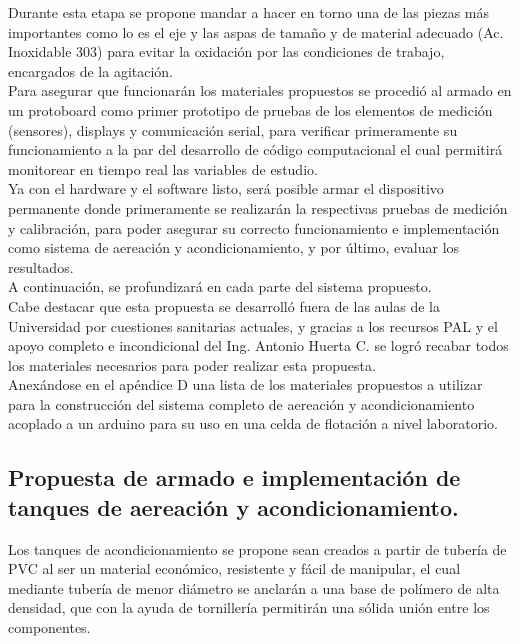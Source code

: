 \documentclass[11pt,letter
								]
								{article}
\begin{document}
Durante esta etapa se propone  mandar a hacer en torno  una de  las piezas más importantes como lo es el eje y las aspas  de tamaño y de material adecuado (Ac. Inoxidable 303) para evitar la oxidación por las condiciones de trabajo, encargados de la agitación. \\



Para asegurar que funcionarán los materiales propuestos  se procedió al armado  en un  protoboard como primer prototipo de pruebas de los elementos  de medición (sensores), displays y comunicación serial, para verificar primeramente su funcionamiento a la par del desarrollo de código computacional el cual permitirá monitorear en tiempo real las variables de estudio.\\


Ya con el hardware y el software listo, será posible armar el dispositivo  permanente donde  primeramente se realizarán la respectivas pruebas de medición y calibración, para poder asegurar su correcto funcionamiento e implementación como sistema de aereación y acondicionamiento, y  por último,  evaluar los resultados. \\ 

A continuación, se profundizará en cada parte del sistema propuesto.\\


Cabe destacar que esta propuesta se desarrolló fuera de las aulas de la Universidad por cuestiones sanitarias actuales, y  gracias a los recursos PAL y el apoyo completo e incondicional  del Ing. Antonio Huerta C. se  logró recabar todos los materiales necesarios para poder realizar esta propuesta. \\

Anexándose en el apéndice D  una lista de los materiales propuestos a utilizar  para la construcción del  sistema completo de  aereación y acondicionamiento acoplado a un arduino para su uso en una celda de flotación a nivel laboratorio.





	\subsection[Propuesta de armado e implementación de tanques  de aereación \\ y acondicionamiento.]
{Propuesta de armado e implementación de tanques  de aereación y acondicionamiento.}

Los tanques de acondicionamiento se propone sean creados a partir de tubería de PVC al ser un material económico, resistente y fácil de manipular, el cual mediante tubería de menor diámetro se anclarán a una base de polímero de alta densidad, que con la ayuda de tornillería permitirán una sólida unión entre los componentes.\\
\end{document}
